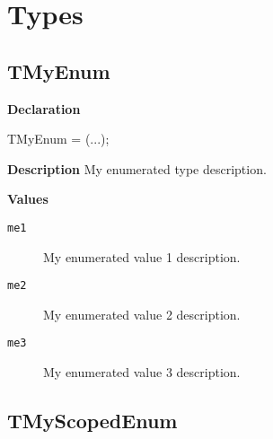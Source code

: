 \documentclass{report}
\newif\ifpdf
\begin{document}
\section{Types}
\ifpdf
\subsection*{\large{\textbf{TMyEnum}}\normalsize\hspace{1ex}\hrulefill}
\else
\subsection*{TMyEnum}
\fi
\label{ok_enum_links-TMyEnum}
\begin{list}{}{
\setlength{\itemindent}{0cm}
\setlength{\listparindent}{0cm}
\setlength{\leftmargin}{\evensidemargin}
\addtolength{\leftmargin}{\tmplength}
\settowidth{\labelsep}{X}
\addtolength{\leftmargin}{\labelsep}
\setlength{\labelwidth}{\tmplength}
}
\item[\textbf{Declaration}\hfill]
\ifpdf
\begin{flushleft}
\fi
\begin{ttfamily}
TMyEnum = (...);\end{ttfamily}

\ifpdf
\end{flushleft}
\fi

\par
\item[\textbf{Description}]
My enumerated type description.\item[\textbf{Values}]
\begin{description}
\item[\texttt{me1}] \label{ok_enum_links-me1}
\index{}
My enumerated value 1 description.
\item[\texttt{me2}] \label{ok_enum_links-me2}
\index{}
My enumerated value 2 description.
\item[\texttt{me3}] \label{ok_enum_links-me3}
\index{}
My enumerated value 3 description.
\end{description}


\end{list}
\ifpdf
\subsection*{\large{\textbf{TMyScopedEnum}}\normalsize\hspace{1ex}\hrulefill}
\else
\end{document}
